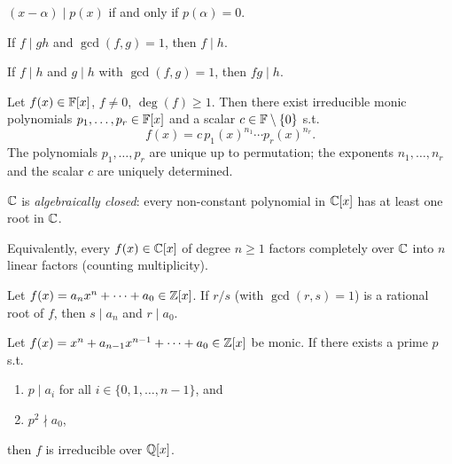 \begin{corbox}
$(x-\alpha)\mid p(x)$ if and only if $p(\alpha)=0$.
\end{corbox}

\begin{thmbox}
If $f\mid gh$ and $\gcd(f,g)=1$, then $f\mid h$.
\end{thmbox}

\begin{corbox}
If $f\mid h$ and $g\mid h$ with $\gcd(f,g)=1$, then $fg\mid h$.
\end{corbox}

\begin{thmbox}
Let $f(x)\in\mathbb{F}[x]$, $f\neq 0$, $\deg(f)\geq 1$.  Then there exist irreducible
monic polynomials $p_1,\ldots,p_r\in\mathbb{F}[x]$ and a scalar $c\in\mathbb{F}\setminus\{0\}$
s.t.
\[
    f(x) = c\,p_1(x)^{n_1}\cdots p_r(x)^{n_r}.
\]
The polynomials $p_1,\ldots,p_r$ are unique up to permutation; the exponents
$n_1,\ldots,n_r$ and the scalar $c$ are uniquely determined.
\end{thmbox}

\begin{thmbox}
$\mathbb{C}$ is \emph{algebraically closed}: every non-constant polynomial in $\mathbb{C}[x]$
has at least one root in $\mathbb{C}$.

Equivalently, every $f(x)\in\mathbb{C}[x]$ of degree $n\geq 1$ factors completely over
$\mathbb{C}$ into $n$ linear factors (counting multiplicity).
\end{thmbox}

\begin{thmbox}
Let $f(x) = a_n x^n + \cdots + a_0\in\mathbb{Z}[x]$.  If $r/s$ (with $\gcd(r,s)=1$)
is a rational root of $f$, then $s\mid a_n$ and $r\mid a_0$.
\end{thmbox}

\begin{thmbox}
Let $f(x) = x^n + a_{n-1}x^{n-1} + \cdots + a_0\in\mathbb{Z}[x]$ be monic.  If there
exists a prime $p$ s.t.
\begin{enumerate}
    \item $p\mid a_i$ for all $i\in\{0,1,\ldots,n-1\}$, and
    \item $p^2\nmid a_0$,
\end{enumerate}
then $f$ is irreducible over $\mathbb{Q}[x]$.
\end{thmbox}

